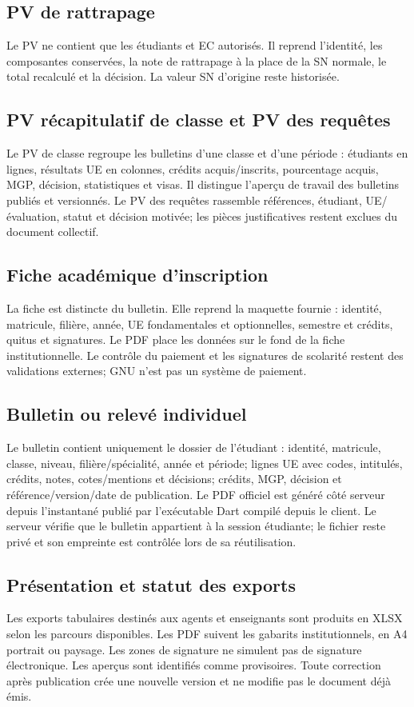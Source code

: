 \documentclass[11pt,a4paper]{article}
\begin{document}
\subsection{PV de rattrapage}
Le PV ne contient que les étudiants et EC autorisés. Il reprend l’identité, les composantes conservées, la note de rattrapage à la place de la SN normale, le total recalculé et la décision. La valeur SN d’origine reste historisée.

\subsection{PV récapitulatif de classe et PV des requêtes}
Le PV de classe regroupe les bulletins d’une classe et d’une période : étudiants en lignes, résultats UE en colonnes, crédits acquis/inscrits, pourcentage acquis, MGP, décision, statistiques et visas. Il distingue l’aperçu de travail des bulletins publiés et versionnés. Le PV des requêtes rassemble références, étudiant, UE/évaluation, statut et décision motivée; les pièces justificatives restent exclues du document collectif.

\subsection{Fiche académique d’inscription}
La fiche est distincte du bulletin. Elle reprend la maquette fournie : identité, matricule, filière, année, UE fondamentales et optionnelles, semestre et crédits, quitus et signatures. Le PDF place les données sur le fond de la fiche institutionnelle. Le contrôle du paiement et les signatures de scolarité restent des validations externes; GNU n’est pas un système de paiement.

\subsection{Bulletin ou relevé individuel}
Le bulletin contient uniquement le dossier de l’étudiant : identité, matricule, classe, niveau, filière/spécialité, année et période; lignes UE avec codes, intitulés, crédits, notes, cotes/mentions et décisions; crédits, MGP, décision et référence/version/date de publication. Le PDF officiel est généré côté serveur depuis l’instantané publié par l’exécutable Dart compilé depuis le client. Le serveur vérifie que le bulletin appartient à la session étudiante; le fichier reste privé et son empreinte est contrôlée lors de sa réutilisation.

\subsection{Présentation et statut des exports}
Les exports tabulaires destinés aux agents et enseignants sont produits en XLSX selon les parcours disponibles. Les PDF suivent les gabarits institutionnels, en A4 portrait ou paysage. Les zones de signature ne simulent pas de signature électronique. Les aperçus sont identifiés comme provisoires. Toute correction après publication crée une nouvelle version et ne modifie pas le document déjà émis.
\end{document}

